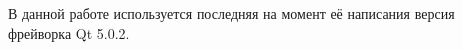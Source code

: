 \documentclass[a4paper, 14pt]{extarticle}
\newcommand{\eng}[1]{{\English #1}}
\newenvironment{myfigure}[2]%
    {\pushQED{\caption{#1} \label{#2}} %
     \begin{figure}[!htb]\centering } %
    {  \popQED %
     \end{figure}}
\newcommand{\includefigure}[3][]{
    \begin{myfigure}{#2}{fig:#3}
      \texttt{[image: \#3]}
    \end{myfigure}
  }
\begin{document}


  В данной работе используется последняя на момент её написания версия фрейворка Qt 5.0.2.


\end{document}
